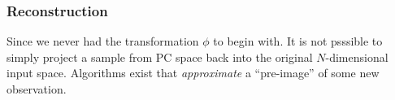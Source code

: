\subsubsection{Reconstruction}

\begin{frame}{\subsubsecname}


Since we never had the transformation $\phi$ to begin with. 
It is not psssible to simply project a sample from PC space back into the original $N$-dimensional input space. 
Algorithms exist that \emph{approximate} a ``pre-image'' of some new observation.

\end{frame}
